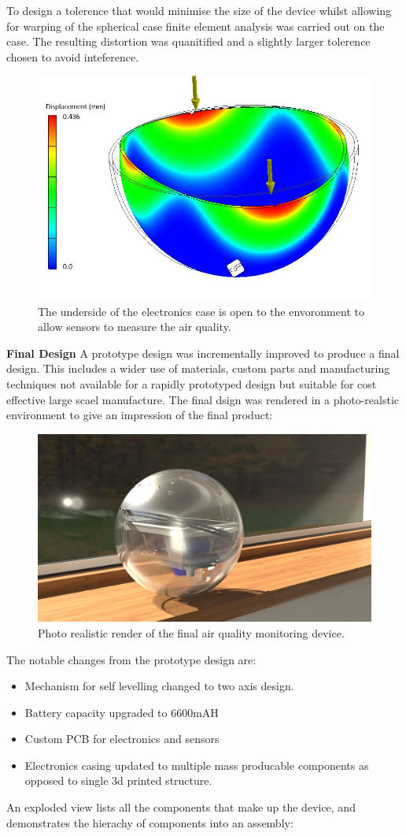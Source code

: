To design a tolerence that would minimise the size of the device whilst allowing for warping of the spherical case finite element analysis was carried out on the case. The resulting distortion was quanitified and a slightly larger tolerence chosen to avoid inteference.

\begin{figure}[H]
\centering
\includegraphics[width=0.5\linewidth]{Engineering_hardware/Engineering_hardware_Figures/FEA.JPG}
\caption{The underside of the electronics case is open to the envoronment to allow sensors to measure the air quality.}
\label{fig:15cm_shell_loading}
\end{figure}


\textbf{Final Design}
A prototype design was incrementally improved to produce a final design. This includes a wider use of materials, custom parts and manufacturing techniques not available for a rapidly prototyped design but suitable for cost effective large scael manufacture. The final dsign was rendered in a photo-realstic environment to give an impression of the final product:

\begin{figure}[H]
\centering
\includegraphics[width=0.8\linewidth]{Engineering_hardware/Engineering_hardware_Figures/0300.png}
\caption{Photo realistic render of the final air quality monitoring device. }
\label{fig:15cm_shell_loading}
\end{figure}
The notable changes from the prototype design are:
\begin{itemize}
\item Mechanism for self levelling changed to two axis design.
\item Battery capacity upgraded to 6600mAH 
\item Custom PCB for electronics and sensors
\item Electronics casing updated to multiple mass producable components as opposed to single 3d printed structure.
\end{itemize}
An exploded view lists all the components that make up the device, and demonstrates the hierachy of components into an assembly:

